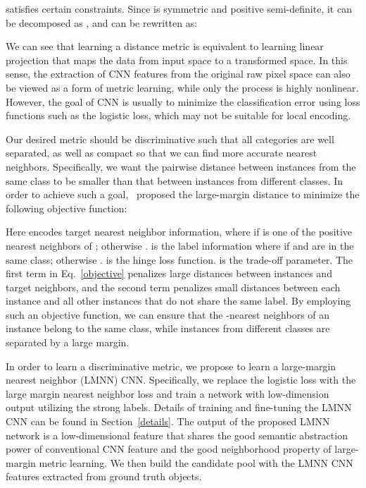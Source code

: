 \documentclass[10pt,twocolumn,letterpaper]{article}
\begin{document}
satisfies certain constraints. Since  is symmetric and
positive semi-definite, it can be decomposed as
,
and  can be rewritten as:


We can see that learning a distance metric is equivalent to
learning linear projection  that maps the data from input space
to a transformed space. In this sense, the extraction of CNN
features from the original raw pixel space can also be viewed as a
form of metric learning, while only the process is highly
nonlinear. However, the goal of CNN is usually to minimize the
classification error using loss functions such as the logistic
loss, which may not be suitable for local encoding.

Our desired metric should be discriminative such that all
categories are well separated, as well as compact so that we can
find more accurate nearest neighbors. Specifically, we want the
pairwise distance between instances from the same class to be
smaller than that between instances from different classes. In
order to achieve such a goal,~\cite{Weinberger2009} proposed the
large-margin distance to minimize the following objective
function:

Here  encodes target nearest neighbor information, where
 if  is one of the  positive
nearest neighbors of ; otherwise . 
is the label information where  if   and
 are in the same class; otherwise .
 is the hinge loss function. 
is the trade-off parameter. The first term in Eq.~\ref{objective}
penalizes large distances between instances and target neighbors,
and the second term penalizes small distances between each
instance and all other instances that do not share the same label.
By employing such an objective function, we can ensure that the
-nearest neighbors of an instance belong to the same
class, while instances from different classes are separated by a
large margin.

In order to learn a discriminative metric, we propose to learn a
large-margin nearest neighbor (LMNN) CNN. Specifically, we replace
the logistic loss with the large margin nearest neighbor loss and
train a network with low-dimension output utilizing the strong
labels. Details of training and fine-tuning the LMNN CNN can be
found in Section~\ref{details}. The output of the proposed LMNN
network is a low-dimensional feature that shares the good semantic
abstraction power of conventional CNN feature and the good
neighborhood property of large-margin metric learning. We then
build the candidate pool with the LMNN CNN features extracted from
ground truth objects.
\end{document}
